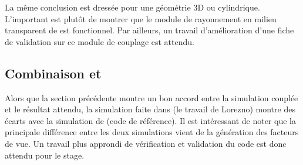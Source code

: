 La même conclusion est dressée pour une géométrie 3D ou cylindrique. L'important est plutôt de montrer que le module de rayonnement en milieu transparent de  est fonctionnel. Par ailleurs, un travail d'amélioration d'une fiche de validation sur ce module de couplage est attendu.


\subsection{Combinaison  et }
Alors que la section précédente montre un bon accord entre la simulation couplée et le résultat attendu, la simulation faite dans \cite{lorenzo} (le travail de Lorezno) montre des écarts avec la simulation de \cite{Romain25} (code de référence). Il est intéressant de noter que la principale différence entre les deux simulations vient de la génération des facteurs de vue. Un travail plus approndi de vérification et validation du code  est donc attendu pour le stage.


